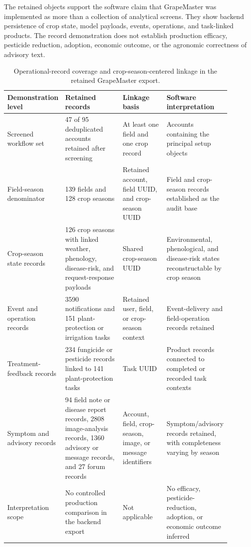 \documentclass[12pt]{article}
\begin{document}
The retained objects support the software claim that GrapeMaster was implemented as more than a collection of analytical screens. They show backend persistence of crop state, model payloads, events, operations, and task-linked products. The record demonstration does not establish production efficacy, pesticide reduction, adoption, economic outcome, or the agronomic correctness of advisory text.

\begin{table}[H]
\centering
\begingroup
\setlength{\tabcolsep}{3pt}
\renewcommand{\arraystretch}{1.12}
\scriptsize
\caption{Operational-record coverage and crop-season-centered linkage in the retained GrapeMaster export.}
\label{tab:backend_operational_coverage}
\begin{minipage}{0.98\linewidth}
\begin{tabular}{p{0.21\linewidth} p{0.30\linewidth} p{0.22\linewidth} p{0.18\linewidth}}
\toprule
Demonstration level & Retained records & Linkage basis & Software interpretation \\
\midrule
Screened workflow set & 47 of 95 deduplicated accounts retained after screening & At least one field and one crop record & Accounts containing the principal setup objects \\
Field-season denominator & 139 fields and 128 crop seasons & Retained account, field UUID, and crop-season UUID & Field and crop-season records established as the audit base \\
Crop-season state records & 126 crop seasons with linked weather, phenology, disease-risk, and request-response payloads & Shared crop-season UUID & Environmental, phenological, and disease-risk states reconstructable by crop season \\
Event and operation records & 3590 notifications and 151 plant-protection or irrigation tasks & Retained user, field, or crop-season context & Event-delivery and field-operation records retained \\
Treatment-feedback records & 234 fungicide or pesticide records linked to 141 plant-protection tasks & Task UUID & Product records connected to completed or recorded task contexts \\
Symptom and advisory records & 94 field note or disease report records, 2808 image-analysis records, 1360 advisory or message records, and 27 forum records & Account, field, crop-season, image, or message identifiers & Symptom/advisory records retained, with completeness varying by season \\
Interpretation scope & No controlled production comparison in the backend export & Not applicable & No efficacy, pesticide-reduction, adoption, or economic outcome inferred \\
\bottomrule
\end{tabular}
\par\vspace{0.25em}{\raggedright\scriptsize Abbreviation: UUID, universally unique identifier.\par}
\end{minipage}
\endgroup
\end{table}
\end{document}
